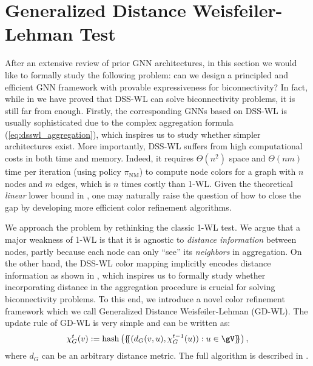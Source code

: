 \documentclass{article} %
\let\cref\crtcref
\newcommand*{\ldblbrace}{\{\mskip-5mu\{}
\newcommand*{\rdblbrace}{\}\mskip-5mu\}}
\begin{document}
\section{Generalized Distance Weisfeiler-Lehman Test}
\vspace{-2pt}
\label{sec:gdwl}
After an extensive review of prior GNN architectures, in this section we would like to formally study the following problem: can we design a principled and efficient GNN framework with provable expressiveness for biconnectivity? In fact, while in \cref{sec:esan} we have proved that DSS-WL can solve biconnectivity problems, it is still far from enough. Firstly, the corresponding GNNs based on DSS-WL is usually sophisticated due to the complex aggregation formula (\ref{eq:dsswl_aggregation}), which inspires us to study whether simpler architectures exist. More importantly, DSS-WL suffers from high computational costs in both time and memory. Indeed, it requires $\Theta(n^2)$ space and $\Theta(nm)$ time per iteration (using policy $\pi_\mathrm{NM}$) to compute node colors for a graph with $n$ nodes and $m$ edges, which is $n$ times costly than 1-WL. Given the theoretical \emph{linear} lower bound in \cref{thm:tarjan}, one may naturally raise the question of how to close the gap by developing more efficient color refinement algorithms.

\vspace{-1pt}

We approach the problem by rethinking the classic 1-WL test. We argue that a major weakness of 1-WL is that it is agnostic to \emph{distance information} between nodes, partly because each node can only ``see'' its \emph{neighbors} in aggregation. On the other hand, the DSS-WL color mapping implicitly encodes distance information as shown in \cref{sec:esan}, which inspires us to formally study whether incorporating distance in the aggregation procedure is crucial for solving biconnectivity problems. To this end, we introduce a novel color refinement framework which we call Generalized Distance Weisfeiler-Lehman (GD-WL). The update rule of GD-WL is very simple and can be written as:
\begin{equation}
    \label{eq:gdwl}
    \chi_G^t(v):= \operatorname{hash}\left(\ldblbrace (d_G(v,u), \chi_G^{t-1}(u)):u\in \gV\rdblbrace\right),
\end{equation}
where $d_G$ can be an arbitrary distance metric. The full algorithm is described in \cref{alg:gdwl}.
\end{document}
